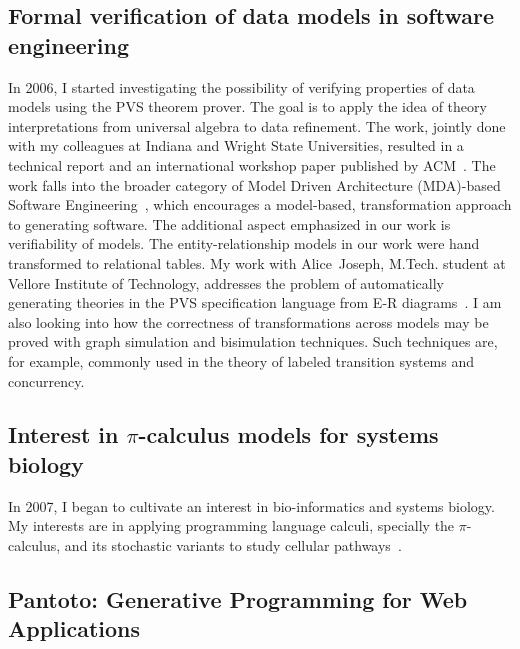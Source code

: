 \documentclass[titlepage, %
11pt, 
]{article}
\begin{document}
\subsection{Formal verification of data models in software engineering}
\label{subsec:formal-verification}
In 2006, I started investigating the possibility of
verifying properties of data models using the PVS theorem
prover.  The goal is to apply the idea of theory
interpretations from universal algebra to data refinement.
The work, jointly done with my colleagues at Indiana and
Wright State Universities, resulted in a technical report
and an international workshop paper published by
ACM~\cite{choppella-et-al-afm07,choppella-sengupta-robertson-johnson-tr-2006}.
The work falls into the broader category of Model Driven
Architecture (MDA)-based Software
Engineering~\cite{kleppe-et-al-mda-explained-2003}, which
encourages a model-based, transformation approach to
generating software.  The additional aspect emphasized in
our work is verifiability of models.  The
entity-relationship models in our work were hand transformed
to relational tables.  My work with Alice~Joseph, M.Tech.\@
student at Vellore Institute of Technology, addresses the
problem of automatically generating theories in the PVS
specification language from E-R diagrams~\cite{joseph-2008}.
I am also looking into how the correctness of
transformations across models may be proved with graph
simulation and bisimulation techniques.  Such techniques
are, for example, commonly used in the theory of labeled
transition systems and concurrency.

\subsection{Interest in $\pi$-calculus models for systems biology}
\label{subsec:pi-calculus}
In 2007, I began to cultivate an interest in bio-informatics
and systems biology.  My interests are in applying
programming language calculi, specially the $\pi$-calculus,
and its stochastic variants to study cellular
pathways~\cite{Regev-Shapiro-pi-calulus-modeling-chapter-2004}.



\subsection{Pantoto: Generative Programming for Web Applications}
\label{subsec:pantoto}
\end{document}
